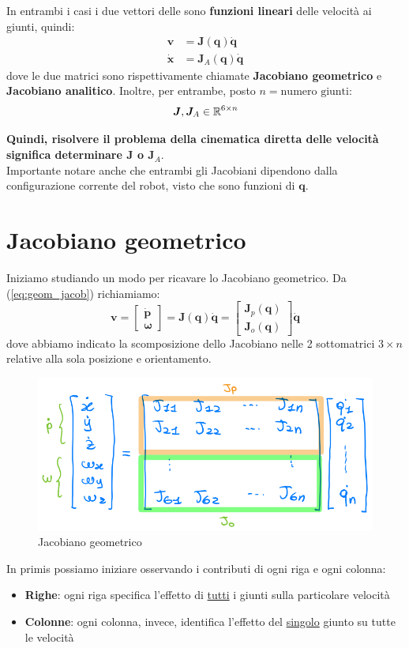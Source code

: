 In entrambi i casi i due vettori delle sono \textbf{funzioni lineari} delle velocità ai giunti, quindi:
\begin{align}
	\bm{v} &= \bm{J}(\bm{q})\dot{\bm{q}} \label{eq:geom_jacob} \\ 
	\bm{\dot{x}} &= \bm{J}_A(\bm{q})\dot{\bm{q}} \label{eq:analy_jacob}
\end{align}
dove le due matrici sono rispettivamente chiamate \textbf{Jacobiano geometrico} e \textbf{Jacobiano analitico}. Inoltre, per entrambe, posto $n=\text{numero giunti}$:
$$
\bm{J},\bm{J}_A \in \mathbb{R}^{6\times n}
$$

\textbf{Quindi, risolvere il problema della cinematica diretta delle velocità significa determinare $\bm{J}$ o $\bm{J}_A$}. \\
Importante notare anche che entrambi gli Jacobiani dipendono dalla configurazione corrente del robot, visto che sono funzioni di $\bm{q}$.




\section{Jacobiano geometrico}
Iniziamo studiando un modo per ricavare lo Jacobiano geometrico. Da (\ref{eq:geom_jacob}) richiamiamo:
\begin{equation}\label{eq:geom_jacob_2}
\bm{v} 
=
\begin{bmatrix*}
\dot{\bm{p}} \\
\bm{\omega}
\end{bmatrix*}
=
\bm{J}(\bm{q})\dot{\bm{q}} 
=
\begin{bmatrix*}
	\bm{J}_p(\bm{q}) \\
	\bm{J}_o(\bm{q}) 
\end{bmatrix*}
\dot{\bm{q}}
\end{equation}
dove abbiamo indicato la scomposizione dello Jacobiano nelle 2 sottomatrici $3\times n$ relative alla sola posizione e orientamento.

\begin{figure}[H]
	\centering
	\includegraphics[width=0.6\linewidth]{images/diff_kine_1}
	\caption{Jacobiano geometrico}
	\label{fig:diffkine1}
\end{figure}
In primis possiamo iniziare osservando i contributi di ogni riga e ogni colonna:
\begin{itemize}
	\item \textbf{Righe}: ogni riga specifica l'effetto di \underline{tutti} i giunti sulla particolare velocità
	\item \textbf{Colonne}: ogni colonna, invece, identifica l'effetto del \underline{singolo} giunto su tutte le velocità
\end{itemize}

